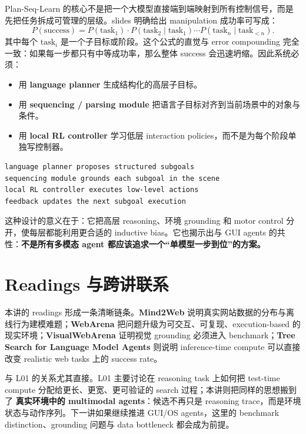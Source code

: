 Plan-Seq-Learn 的核心不是把一个大模型直接端到端映射到所有控制信号，而是先把任务拆成可管理的层级。slides 明确给出 manipulation 成功率可写成：
\[
P(\mathrm{success}) = P(\mathrm{task}_1) \cdot P(\mathrm{task}_2\mid \mathrm{task}_1) \cdots P(\mathrm{task}_n\mid \mathrm{task}_{<n}).
\]
其中每个 $\mathrm{task}_i$ 是一个子目标或阶段。这个公式的直觉与 error compounding 完全一致：如果每一步都只有中等成功率，那么整体 success 会迅速坍缩。因此系统必须：
\begin{itemize}
\item 用 \textbf{language planner} 生成结构化的高层子目标。
\item 用 \textbf{sequencing / parsing module} 把语言子目标对齐到当前场景中的对象与条件。
\item 用 \textbf{local RL controller} 学习低层 interaction policies，而不是为每个阶段单独写控制器。
\end{itemize}

\begin{lstlisting}
language planner proposes structured subgoals
sequencing module grounds each subgoal in the scene
local RL controller executes low-level actions
feedback updates the next subgoal execution
\end{lstlisting}

这种设计的意义在于：它把高层 reasoning、环境 grounding 和 motor control 分开，使每层都能利用更合适的 inductive bias。它也揭示出与 GUI agents 的共性：\textbf{不是所有多模态 agent 都应该追求一个“单模型一步到位”的方案。}

\section{Readings 与跨讲联系}

本讲的 readings 形成一条清晰链条。\textbf{Mind2Web} 说明真实网站数据的分布与离线行为建模难题；\textbf{WebArena} 把问题升级为可交互、可复现、execution-based 的现实环境；\textbf{VisualWebArena} 证明视觉 grounding 必须进入 benchmark；\textbf{Tree Search for Language Model Agents} 则说明 inference-time compute 可以直接改变 realistic web tasks 上的 success rate。

与 L01 的关系尤其直接。L01 主要讨论在 reasoning task 上如何把 test-time compute 分配给更长、更宽、更可验证的 search 过程；本讲则把同样的思想搬到了 \textbf{真实环境中的 multimodal agents}：候选不再只是 reasoning trace，而是环境状态与动作序列。下一讲如果继续推进 GUI/OS agents，这里的 benchmark distinction、grounding 问题与 data bottleneck 都会成为前提。

